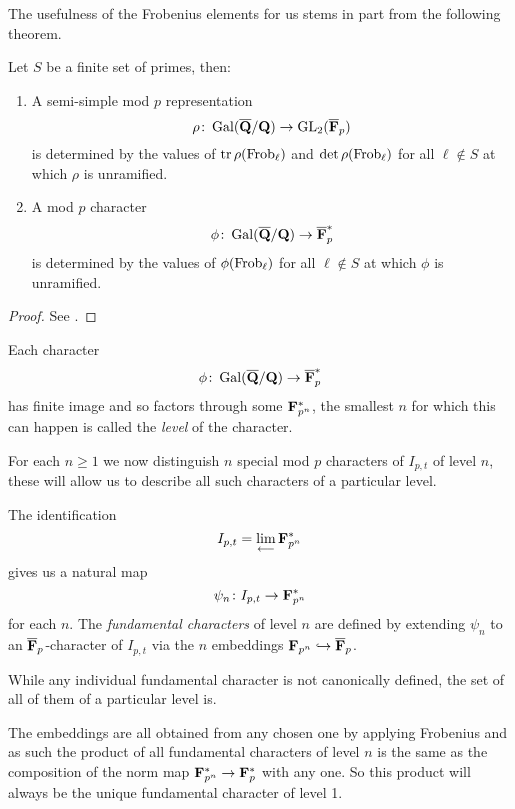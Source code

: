 \documentclass[a4paper,12pt]{article}
\begin{document}
The usefulness of the Frobenius elements for us stems in part from the following theorem.

\begin{thm}\label{thm:cheb}
Let $S$ be a finite set of primes, then:
\begin{enumerate}
\item A semi-simple mod $p$ representation
\[
\rho\colon \operatorname{Gal}(\overline{\mathbf{Q}}/\mathbf{Q}) \to \operatorname{GL}_2(\overline{\mathbf{F}}_p)
\]
is determined by the values of $\operatorname{tr}\rho(\operatorname{Frob}_\ell)$ and $\det\rho(\operatorname{Frob}_\ell)$ for all $\ell\not\in S$ at which $\rho$ is unramified.

\item A mod $p$ character
\[
\phi\colon \operatorname{Gal}(\overline{\mathbf{Q}}/\mathbf{Q}) \to \overline{\mathbf{F}}_p^*
\]
is determined by the values of $\phi(\operatorname{Frob}_\ell)$ for all $\ell\not\in S$ at which $\phi$ is unramified.
\end{enumerate}

\end{thm}
\begin{proof}
See \cite[prop. 25]{DDT}.
\end{proof}


\begin{defn}
Each character
\[
\phi \colon \operatorname{Gal}(\overline{\mathbf{Q}}/\mathbf{Q}) \to \overline{\mathbf{F}}_p^*
\]
has finite image and so factors through some $\mathbf{F}_{p^n}^*$, the smallest $n$ for which this can happen is called the \emph{level} of the character.
\end{defn}


For each $n \ge 1$ we now distinguish $n$ special mod $p$ characters of $I_{p,t}$ of level $n$, these will allow us to describe all such characters of a particular level.

\begin{defn}\label{def:fund}
The identification
\[
I_{p,t}  =  \lim_{\longleftarrow} \mathbf{F}_{p^n}^*
\]
gives us a natural map
\[
\psi_n\colon I_{p,t} \to \mathbf{F}_{p^n}^*
\]
for each $n$.
The \emph{fundamental characters} of level $n$ are defined by extending $\psi_n$ to an $\overline{\mathbf{F}}_p$-character of $I_{p,t}$ via the $n$ embeddings $\mathbf{F}_{p^n} \hookrightarrow \overline{\mathbf{F}}_p$.

While any individual fundamental character is not canonically defined, the set of all of them of a particular level is.
\end{defn}

\begin{rmk}\label{rmk:prodchar}
The embeddings are all obtained from any chosen one by applying Frobenius and as such the product of all fundamental characters of level $n$ is the same as the composition of the norm map $\mathbf{F}_{p^n}^* \to \mathbf{F}_p^*$ with any one.
So this product will always be the unique fundamental character of level 1.
\end{rmk}
\end{document}
